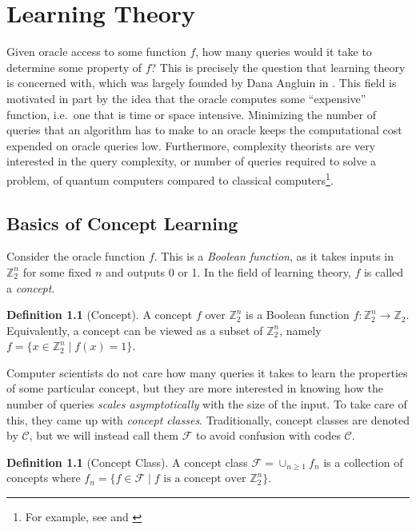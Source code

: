 \documentclass[12pt,twoside]{reedthesis}
\theoremstyle{definition}
\newtheorem{definition}[theorem]{Definition}
\newlength{\arrow}
\newcommand{\Z}{\mathbb{Z}}
\begin{document}
\chapter{Learning Theory}

Given oracle  access to some function $f$, how many queries would it take to determine some property of $f$? This is precisely the question that learning theory is concerned with, which was largely founded by Dana Angluin in \citep{angluin1988queries}. This field is motivated in part by the idea that the oracle computes some ``expensive'' function, i.e.~one that is time or space intensive. Minimizing the number of queries that an algorithm has to make to an oracle keeps the computational cost expended on oracle queries low. Furthermore, complexity theorists are very interested in the query complexity, or number of queries required to solve a problem, of quantum computers compared to classical computers\footnote{For example, see \citep{gortler2001quantum} and \citep{atici2005improved}}.

\section{Basics of Concept Learning}
Consider the oracle function $f$. This is a \textit{Boolean function}, as it takes inputs in $\Z_2^n $ for some fixed $n$ and outputs 0 or 1. In the field of learning theory, $f$ is called a \textit{concept}.

\begin{definition}[Concept] A concept $f$ over $\Z_2^n$ is a Boolean function $f: \Z_2^n \rightarrow \Z_2$. Equivalently, a concept can be viewed as a subset of $\Z_2^n$, namely $f = \{x \in \Z_2^n \mid f(x) = 1\}$.
\end{definition}

Computer scientists do not care how many queries it takes to learn the properties of some particular concept, but they are more interested in knowing how the number of queries \textit{scales asymptotically} with the size of the input. To take care of this, they came up with 
\textit{concept classes}. Traditionally, concept classes are denoted by $\mathcal{C}$, but we will instead call them $\mathcal{F}$ to avoid confusion with codes $\mathscr{C}$. 

\begin{definition}[Concept Class] A concept class $\mathcal{F} = \cup_{n \geq 1} f_n$ is a collection of concepts where $f_n = \{f \in \mathcal{F} \mid f \text{ is a concept over } \Z_2^n\}$.
\end{definition}
\end{document}
